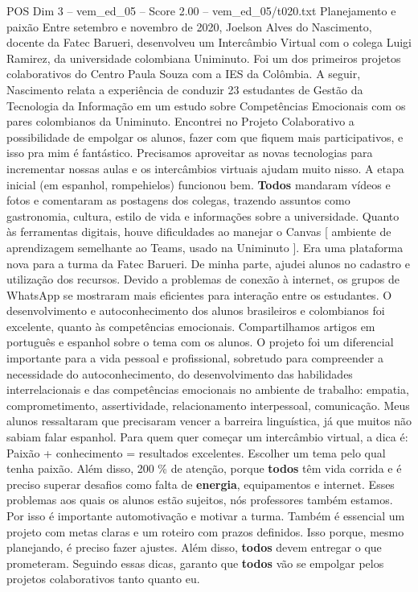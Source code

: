 \begin{textsample}{POS Dim 3 – vem\_ed\_05 – Score 2.00 – vem\_ed\_05/t020.txt}  \label{ex:f3_pos_039}
Planejamento e paixão Entre setembro e novembro de 2020, Joelson Alves do Nascimento, docente da Fatec Barueri, desenvolveu um Intercâmbio Virtual com o colega Luigi Ramirez, da universidade colombiana Uniminuto.
Foi um dos primeiros projetos colaborativos do Centro Paula Souza com a IES da Colômbia.
A seguir, Nascimento relata a experiência de conduzir 23 estudantes de Gestão da Tecnologia da Informação em um estudo sobre Competências Emocionais com os pares colombianos da Uniminuto.
Encontrei no Projeto Colaborativo a possibilidade de empolgar os alunos, fazer com que fiquem mais participativos, e isso pra mim é fantástico.
Precisamos aproveitar as novas tecnologias para incrementar nossas aulas e os intercâmbios virtuais ajudam muito nisso.
A etapa inicial (em espanhol, rompehielos) funcionou bem. \textbf{Todos} mandaram vídeos e fotos e comentaram as postagens dos colegas, trazendo assuntos como gastronomia, cultura, estilo de vida e informações sobre a universidade.
Quanto às ferramentas digitais, houve dificuldades ao manejar o Canvas [ ambiente de aprendizagem semelhante ao Teams, usado na Uniminuto ].
Era uma plataforma nova para a turma da Fatec Barueri.
De minha parte, ajudei alunos no cadastro e utilização dos recursos.
Devido a problemas de conexão à internet, os grupos de WhatsApp se mostraram mais eficientes para interação entre os estudantes.
O desenvolvimento e autoconhecimento dos alunos brasileiros e colombianos foi excelente, quanto às competências emocionais.
Compartilhamos artigos em português e espanhol sobre o tema com os alunos.
O projeto foi um diferencial importante para a vida pessoal e profissional, sobretudo para compreender a necessidade do autoconhecimento, do desenvolvimento das habilidades interrelacionais e das competências emocionais no ambiente de trabalho: empatia, comprometimento, assertividade, relacionamento interpessoal, comunicação.
Meus alunos ressaltaram que precisaram vencer a barreira linguística, já que muitos não sabiam falar espanhol.
Para quem quer começar um intercâmbio virtual, a dica é: Paixão + conhecimento = resultados excelentes.
Escolher um tema pelo qual tenha paixão.
Além disso, 200 \% de atenção, porque \textbf{todos} têm vida corrida e é preciso superar desafios como falta de \textbf{energia}, equipamentos e internet.
Esses problemas aos quais os alunos estão sujeitos, nós professores também estamos.
Por isso é importante automotivação e motivar a turma.
Também é essencial um projeto com metas claras e um roteiro com prazos definidos.
Isso porque, mesmo planejando, é preciso fazer ajustes.
Além disso, \textbf{todos} devem entregar o que prometeram.
Seguindo essas dicas, garanto que \textbf{todos} vão se empolgar pelos projetos colaborativos tanto quanto eu.

\end{textsample}
